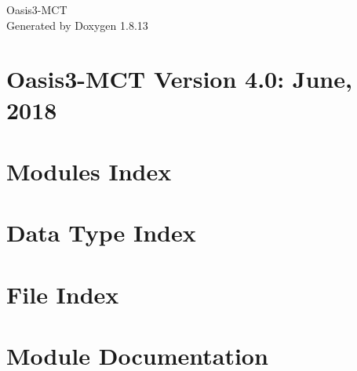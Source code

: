 \documentclass[twoside]{book}
\newcommand{\+}{\discretionary{\mbox{\scriptsize$\hookleftarrow$}}{}{}}
\newcommand{\clearemptydoublepage}{%
  \newpage{\pagestyle{empty}\cleardoublepage}%
}
\begin{document}
\hypersetup{pageanchor=false,
             bookmarksnumbered=true,
             pdfencoding=unicode
            }
\begin{titlepage}
\vspace*{7cm}
\begin{center}%
{\Large Oasis3-\/\+M\+CT }\\
\vspace*{1cm}
{\large Generated by Doxygen 1.8.13}\\
\end{center}
\end{titlepage}
\clearemptydoublepage
{}
\tableofcontents
\clearemptydoublepage
{}
\hypersetup{pageanchor=true}

\chapter{Oasis3-\/\+M\+CT Version 4.0\+: June, 2018}
\label{index}\hypertarget{index}{}
\chapter{Modules Index}

\chapter{Data Type Index}

\chapter{File Index}

\chapter{Module Documentation}























\end{document}

